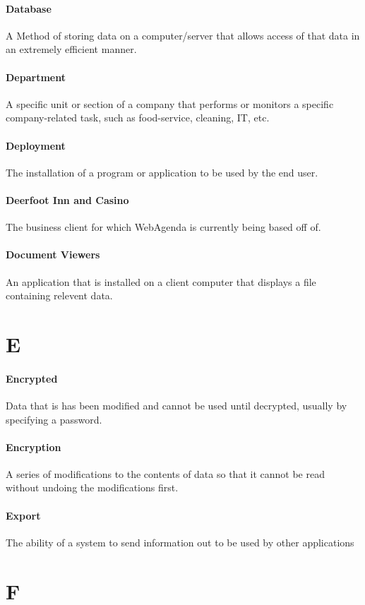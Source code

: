 \documentclass[letterpaper,12pt]{report}
\begin{document}
\paragraph{Database} A Method of storing data on a computer/server that allows access of that data in an extremely efficient manner.
\paragraph{Department} A specific unit or section of a company that performs or monitors a specific company-related task, such as food-service, cleaning, IT, etc.
\paragraph{Deployment} The installation of a program or application to be used by the end user.
\paragraph{Deerfoot Inn and Casino} The business client for which WebAgenda is currently being based off of.
\paragraph{Document Viewers} An application that is installed on a client computer that displays a file containing relevent data.
\section*{E}
\paragraph{Encrypted} Data that is has been modified and cannot be used until decrypted, usually by specifying a password.
\paragraph{Encryption} A series of modifications to the contents of data so that it cannot be read without undoing the modifications first.
\paragraph{Export} The ability of a system to send information out to be used by other applications 
\section*{F}
\end{document}

